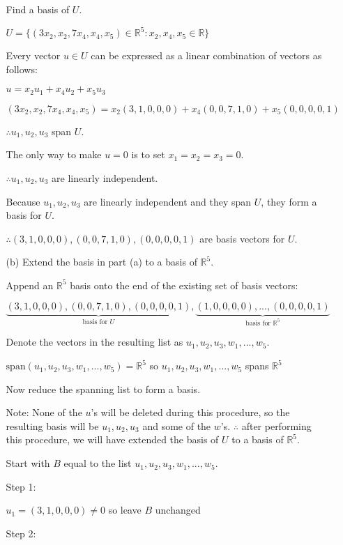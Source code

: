 \documentclass[fleqn]{article}
\begin{document}
\begin{enumerate}[nolistsep]
\begin{enumerate}[nolistsep]
				Find a basis of $U$.
				
				$U = \{(3x_2, x_2, 7x_4, x_4, x_5) \in \mathbb{R}^5 : x_2, x_4, x_5 \in \mathbb{R}\}$
				
				Every vector $u \in U$ can be expressed as a linear combination of vectors as follows:
				
				$u = x_2u_1 + x_4u_2 + x_5u_3$
				
				$(3x_2, x_2, 7x_4, x_4, x_5) = x_2(3, 1, 0, 0, 0) + x_4(0, 0, 7, 1, 0) + x_5(0, 0, 0, 0, 1)$
				
				$\therefore u_1, u_2, u_3$ span $U$.
									
				The only way to make $u = 0$ is to set $x_1 = x_2 = x_3 = 0$.
				
				$\therefore u_1, u_2, u_3$ are linearly independent.
				
				Because $u_1, u_2, u_3$ are linearly independent and they span $U$, they form a basis for $U$.
				
				$\therefore (3, 1, 0, 0, 0), (0, 0, 7, 1, 0), (0, 0, 0, 0, 1)$ are basis vectors for $U$.
				
				\item[(b)] Extend the basis in part (a) to a basis of $\mathbb{R}^5$.
				
				Append an $\mathbb{R}^5$ basis onto the end of the existing set of basis vectors:
				
				$\underbrace{(3,1,0,0,0),(0,0,7,1,0),(0,0,0,0,1)}_{\text{basis for } U},\underbrace{(1,0,0,0,0),...,(0,0,0,0,1)}_{\text{basis for } \mathbb{R}^5}$
				
				Denote the vectors in the resulting list as $u_1, u_2, u_3, w_1, ..., w_5$.
				
				$\text{span}(u_1, u_2, u_3, w_1, ..., w_5) = \mathbb{R}^5$ so $u_1, u_2, u_3, w_1, ..., w_5$ spans $\mathbb{R}^5$
				
				Now reduce the spanning list to form a basis.
				
				Note: None of the $u$'s will be deleted during this procedure, so the resulting basis will be $u_1, u_2, u_3$ and some of the $w$'s. $\therefore$ after performing this procedure, we will have extended the basis of $U$ to a basis of $\mathbb{R}^5$.
				
				Start with $B$ equal to the list $u_1, u_2, u_3, w_1, ..., w_5$.
				
				Step 1: 
				
				$u_1 = (3, 1, 0, 0, 0) \neq 0$ so leave $B$ unchanged
				
				Step 2: 
				

\end{enumerate}
\end{enumerate}
\end{document}
